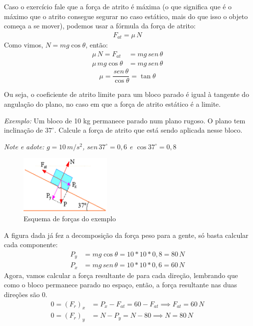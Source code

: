 \documentclass[12pt]{extarticle}
\newcommand{\<}{\langle}
\renewcommand{\>}{\rangle}
\theoremstyle{definition}
\begin{document}
Caso o exercício fale que a força de atrito é máxima (o que significa que é o máximo que o atrito consegue segurar no caso estático, mais do que isso o objeto começa a se mover), podemos usar a fórmula da força de atrito:
\begin{align*}
    F_{at} = \mu\,N
\end{align*}
Como vimos, $N=mg\cos\theta$, então:
\begin{align*}
    \mu\,N = F_{at} &= mg\,sen\,\theta\\
    \mu\,mg\cos\theta &= mg\,sen\,\theta
\end{align*}
\begin{equation}
    \boxed{\mu = \frac{sen\,\theta}{\cos\theta} = \tan\theta}
\end{equation}

Ou seja, o coeficiente de atrito limite para um bloco parado é igual à tangente do angulação do plano, no caso em que a força de atrito estático é a limite.

\textit{Exemplo:} Um bloco de 10 kg permanece parado num plano rugoso. O plano tem inclinação de $37^\circ$. Calcule a força de atrito que está sendo aplicada nesse bloco.

\textit{Note e adote: $g=10\,m/s^2$, $sen\,37^\circ = 0,6$ e $\cos37^\circ =0,8$}
\begin{figure}[H]
    \centering
    \includegraphics[width=0.4\textwidth]{resposta-exercicio-3.jpg}
    \caption{Esquema de forças do exemplo}
    \label{fig:ex_2}
\end{figure}

A figura dada já fez a decomposição da força peso para a gente, só basta calcular cada componente:
\begin{align*}
    P_y &= mg\cos\theta = 10*10*0,8 = 80\, N\\
    P_x &=mg\,sen\,\theta = 10*10*0,6 = 60\,N
\end{align*}
Agora, vamos calcular a força resultante de para cada direção, lembrando que como o bloco permanece parado no espaço, então, a força resultante nas duas direções são 0.
\begin{align*}
    0=(F_r)_x &= P_x - F_{at} = 60 - F_{at} \implies F_{at} = 60\,N\\
    0=(F_r)_y &= N -P_y = N -80 \implies N = 80\,N\\
\end{align*}
\end{document}
